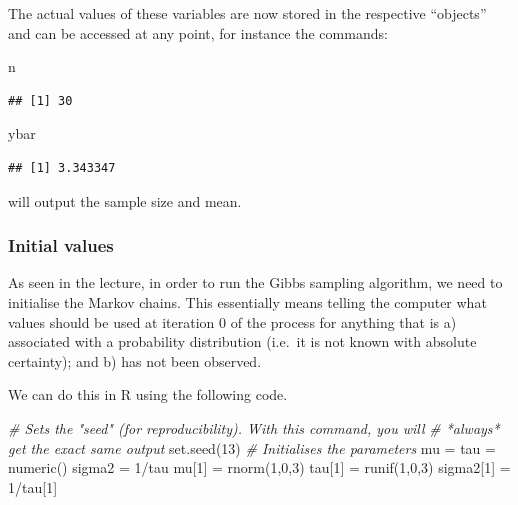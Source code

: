 \documentclass[
]{article}
\newenvironment{Shaded}{\begin{snugshade}}{\end{snugshade}}
\newcommand{\CommentTok}[1]{\textcolor[rgb]{0.56,0.35,0.01}{\textit{#1}}}
\newcommand{\DecValTok}[1]{\textcolor[rgb]{0.00,0.00,0.81}{#1}}
\newcommand{\FunctionTok}[1]{\textcolor[rgb]{0.00,0.00,0.00}{#1}}
\newcommand{\NormalTok}[1]{#1}
\newcommand{\OtherTok}[1]{\textcolor[rgb]{0.56,0.35,0.01}{#1}}
\newcommand{\SpecialCharTok}[1]{\textcolor[rgb]{0.00,0.00,0.00}{#1}}
\begin{document}
The actual values of these variables are now stored in the respective
``objects'' and can be accessed at any point, for instance the commands:

\begin{Shaded}
\begin{Highlighting}[]
\NormalTok{n}
\end{Highlighting}
\end{Shaded}

\begin{verbatim}
## [1] 30
\end{verbatim}

\begin{Shaded}
\begin{Highlighting}[]
\NormalTok{ybar}
\end{Highlighting}
\end{Shaded}

\begin{verbatim}
## [1] 3.343347
\end{verbatim}

will output the sample size and mean.

\hypertarget{initial-values}{%
\subsubsection{Initial values}\label{initial-values}}

As seen in the lecture, in order to run the Gibbs sampling algorithm, we
need to initialise the Markov chains. This essentially means telling the
computer what values should be used at iteration 0 of the process for
anything that is a) associated with a probability distribution (i.e.~it
is not known with absolute certainty); and b) has not been observed.

We can do this in R using the following code.

\begin{Shaded}
\begin{Highlighting}[]
\CommentTok{\# Sets the "seed" (for reproducibility). With this command, you will}
\CommentTok{\# *always* get the exact same output}
\FunctionTok{set.seed}\NormalTok{(}\DecValTok{13}\NormalTok{)}
\CommentTok{\# Initialises the parameters}
\NormalTok{mu }\OtherTok{=}\NormalTok{ tau }\OtherTok{=} \FunctionTok{numeric}\NormalTok{()}
\NormalTok{sigma2 }\OtherTok{=} \DecValTok{1}\SpecialCharTok{/}\NormalTok{tau}
\NormalTok{mu[}\DecValTok{1}\NormalTok{] }\OtherTok{=} \FunctionTok{rnorm}\NormalTok{(}\DecValTok{1}\NormalTok{,}\DecValTok{0}\NormalTok{,}\DecValTok{3}\NormalTok{)}
\NormalTok{tau[}\DecValTok{1}\NormalTok{] }\OtherTok{=} \FunctionTok{runif}\NormalTok{(}\DecValTok{1}\NormalTok{,}\DecValTok{0}\NormalTok{,}\DecValTok{3}\NormalTok{)}
\NormalTok{sigma2[}\DecValTok{1}\NormalTok{] }\OtherTok{=} \DecValTok{1}\SpecialCharTok{/}\NormalTok{tau[}\DecValTok{1}\NormalTok{]}
\end{Highlighting}
\end{Shaded}
\end{document}
